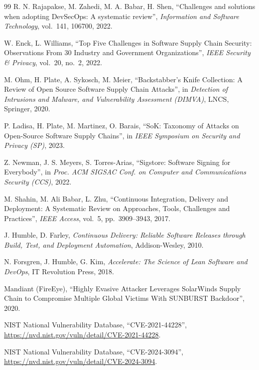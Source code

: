 \documentclass[12pt,a4paper,oneside]{extreport}
\begin{document}
\begin{thebibliography}{99}
  R. N. Rajapakse, M. Zahedi, M. A. Babar, H. Shen, ``Challenges and solutions
  when adopting DevSecOps: A systematic review'', \textit{Information and
  Software Technology}, vol.~141, 106700, 2022.

  W. Enck, L. Williams, ``Top Five Challenges in Software Supply Chain Security:
  Observations From 30 Industry and Government Organizations'', \textit{IEEE
  Security \& Privacy}, vol.~20, no.~2, 2022.

  M. Ohm, H. Plate, A. Sykosch, M. Meier, ``Backstabber's Knife Collection: A
  Review of Open Source Software Supply Chain Attacks'', in \textit{Detection
  of Intrusions and Malware, and Vulnerability Assessment (DIMVA)}, LNCS,
  Springer, 2020.

  P. Ladisa, H. Plate, M. Martinez, O. Barais, ``SoK: Taxonomy of Attacks on
  Open-Source Software Supply Chains'', in \textit{IEEE Symposium on Security
  and Privacy (SP)}, 2023.

  Z. Newman, J. S. Meyers, S. Torres-Arias, ``Sigstore: Software Signing for
  Everybody'', in \textit{Proc. ACM SIGSAC Conf. on Computer and Communications
  Security (CCS)}, 2022.

  M. Shahin, M. Ali Babar, L. Zhu, ``Continuous Integration, Delivery and
  Deployment: A Systematic Review on Approaches, Tools, Challenges and
  Practices'', \textit{IEEE Access}, vol.~5, pp.~3909--3943, 2017.

  J. Humble, D. Farley, \textit{Continuous Delivery: Reliable Software Releases
  through Build, Test, and Deployment Automation}, Addison-Wesley, 2010.

  N. Forsgren, J. Humble, G. Kim, \textit{Accelerate: The Science of Lean
  Software and DevOps}, IT Revolution Press, 2018.

  Mandiant (FireEye), ``Highly Evasive Attacker Leverages SolarWinds Supply
  Chain to Compromise Multiple Global Victims With SUNBURST Backdoor'', 2020.

  NIST National Vulnerability Database, ``CVE-2021-44228'',
  \url{https://nvd.nist.gov/vuln/detail/CVE-2021-44228}.

  NIST National Vulnerability Database, ``CVE-2024-3094'',
  \url{https://nvd.nist.gov/vuln/detail/CVE-2024-3094}.


\end{thebibliography}
\end{document}
